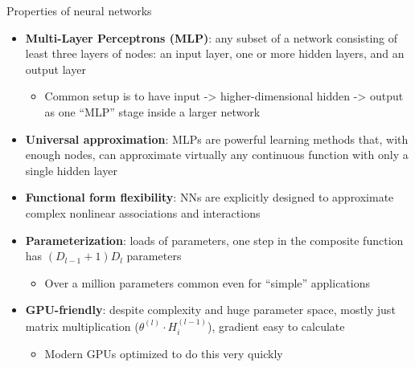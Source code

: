 \documentclass[xcolor=table, aspectratio=169]{beamer}
\newcommand{\alertbf}[1]{\alert{\textbf{#1}}}
\begin{document}
\begin{frame}{Properties of neural networks}
    \begin{itemize}
        \item \alertbf{Multi-Layer Perceptrons (MLP)}: any subset of a network consisting of least three layers of nodes: an input layer, one or more hidden layers, and an output layer
        \begin{itemize}
            \item Common setup is to have input -> higher-dimensional hidden -> output as one ``MLP'' stage inside a larger network
        \end{itemize}
        \item \alertbf{Universal approximation}: MLPs are powerful learning methods that, with enough nodes, can approximate virtually any continuous function with only a single hidden layer
        \item \alertbf{Functional form flexibility}: NNs are explicitly designed to approximate complex nonlinear associations and interactions
        \item \alertbf{Parameterization}: loads of parameters, one step in the composite function has $(D_{l-1}+1) D_l$ parameters
        \begin{itemize}
            \item Over a million parameters common even for ``simple'' applications
        \end{itemize}
        \item \alertbf{GPU-friendly}: despite complexity and huge parameter space, mostly just matrix multiplication ($\theta^{(l)} \cdot H_i^{(l-1)}$), gradient easy to calculate
        \begin{itemize}
            \item Modern GPUs optimized to do this very quickly
        \end{itemize}
    \end{itemize}
\end{frame}
\end{document}
